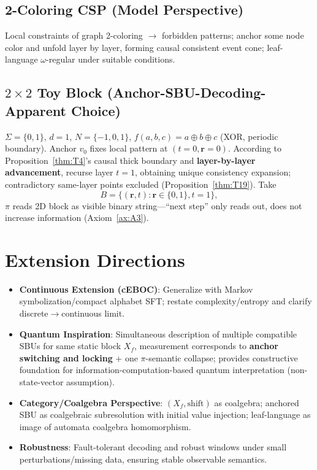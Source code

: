 \documentclass[11pt]{article}
\theoremstyle{definition}
\theoremstyle{remark}
\begin{document}
\subsection{2-Coloring CSP (Model Perspective)}
Local constraints of graph 2-coloring \( \to \) forbidden patterns; anchor some node color and unfold layer by layer, forming causal consistent event cone; leaf-language \( \omega \)-regular under suitable conditions.

\subsection{\(2\times2\) Toy Block (Anchor-SBU-Decoding-Apparent Choice)}
\( \Sigma = \{0,1\} \), \( d=1 \), \( N = \{-1,0,1\} \), \( f(a,b,c) = a \oplus b \oplus c \) (XOR, periodic boundary). Anchor \( v_0 \) fixes local pattern at \( (t=0, \mathbf{r}=0) \). According to Proposition~\ref{thm:T4}'s causal thick boundary and \textbf{layer-by-layer advancement}, recurse layer \( t=1 \), obtaining unique consistency expansion; contradictory same-layer points excluded (Proposition~\ref{thm:T19}). Take
\[
B = \{(\mathbf{r}, t) : \mathbf{r} \in \{0,1\}, t=1\},
\]
\( \pi \) reads 2D block as visible binary string---``next step'' only reads out, does not increase information (Axiom~\ref{ax:A3}).

\section{Extension Directions}

\begin{itemize}
\item \textbf{Continuous Extension (cEBOC)}: Generalize with Markov symbolization/compact alphabet SFT; restate complexity/entropy and clarify discrete\( \to \)continuous limit.
\item \textbf{Quantum Inspiration}: Simultaneous description of multiple compatible SBUs for same static block \( X_f \), measurement corresponds to \textbf{anchor switching and locking} + one \( \pi \)-semantic collapse; provides constructive foundation for information-computation-based quantum interpretation (non-state-vector assumption).
\item \textbf{Category/Coalgebra Perspective}: \( (X_f, \mathrm{shift}) \) as coalgebra; anchored SBU as coalgebraic subresolution with initial value injection; leaf-language as image of automata coalgebra homomorphism.
\item \textbf{Robustness}: Fault-tolerant decoding and robust windows under small perturbations/missing data, ensuring stable observable semantics.
\end{itemize}
\end{document}
